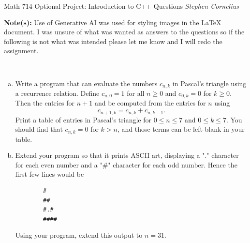 \documentclass{article}
\begin{document}
\begin{center}
    Math 714
    \hfill Optional Project: Introduction to C++ Questions 
    \hfill \textit{Stephen Cornelius}
\end{center}
\textbf{Note(s):} Use of Generative AI was used for styling images in the \LaTeX $\,$document. I was unsure of what was wanted as answers to the questions so if the following is not what was intended please let me know and I will redo the assignment.
\begin{problem} \\ 
\begin{enumerate}[a)]
    \item Write a program that can evaluate the numbers $c_{n,k}$ in Pascal's triangle using a recurrence relation.
Define $c_{n,0} = 1$ for all $n \geq 0$ and $c_{0,k}=0$ for $k \geq 0$. Then the entries for $n + 1$ and be computed from the entries for $n$ using 
\[
		c_{n+1,k} = c_{n,k} + c_{n,k-1}.
	\]
	Print a table of entries in Pascal's triangle for $0 \leq n \leq 7$ and $0 \leq k \leq 7$. You should find that $c_{n,k} = 0$ for $k > n$, and those terms can be left blank in your table.


	\item Extend your program so that it prints ASCII art, displaying a "." character for each even number and a "\#" character for each odd number. Hence the first few lines would be
	\begin{verbatim}
        #
        ##
        #.#
        ####
    \end{verbatim}
	Using your program, extend this output to $n = 31$.
\end{enumerate}
\end{problem}
\end{document}
